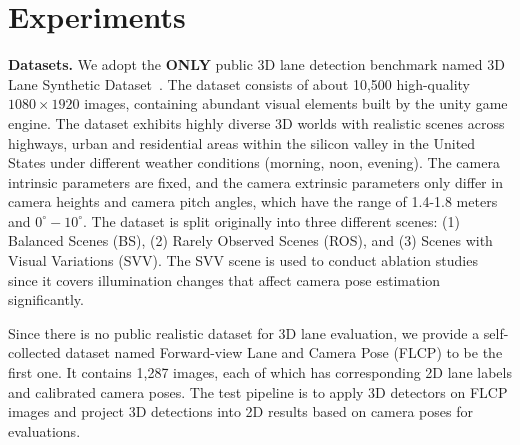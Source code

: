 \documentclass[letterpaper]{article} \usepackage{aaai22}  \usepackage{times}  \usepackage{helvet}  \usepackage{courier}  \usepackage[hyphens]{url}  \usepackage{graphicx} \urlstyle{rm} \def\UrlFont{\rm}  \usepackage{natbib}  \usepackage{caption}
\begin{document}
\begin{table}[t]
\begin{center}
\caption{Comparisons of resource consumption. The number of MACs and parameters (\#Para) are given in GHz and million. The PP means the requirement of post processing like outlier removal and non-maximum suppression.}
\label{tab:ResourceResult}
\end{center}
\vspace{-0.5em}
\end{table}


\section{Experiments}

\noindent \textbf{Datasets.}
We adopt the \textbf{ONLY} public 3D lane detection benchmark named 3D Lane Synthetic Dataset~\cite{GenLaneNet}. The dataset consists of about 10,500 high-quality $1080\times1920$ images, containing abundant visual elements built by the unity game engine.  The dataset exhibits highly diverse 3D worlds with realistic scenes across highways, urban and residential areas within the silicon valley in the United States under different weather conditions (morning, noon, evening). The camera intrinsic parameters are fixed, and the camera extrinsic parameters only differ in camera heights and camera pitch angles, which have the range of 1.4-1.8 meters and $0^\circ-10^\circ$. The dataset is split originally into three different scenes: (1) Balanced Scenes (BS), (2) Rarely Observed Scenes (ROS), and (3) Scenes with Visual Variations (SVV). The SVV scene is used to conduct ablation studies since it covers illumination changes that affect camera pose estimation significantly.

Since there is no public realistic dataset for 3D lane evaluation, we provide a self-collected dataset named Forward-view Lane and Camera Pose (FLCP) to be the first one. It contains 1,287 images, each of which has corresponding 2D lane labels and calibrated camera poses. The test pipeline is to apply 3D detectors on FLCP images and project 3D detections into 2D results based on camera poses for evaluations. 
\end{document}
